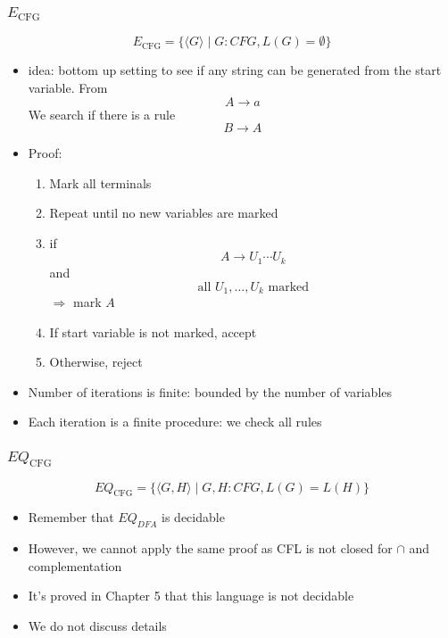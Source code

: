 \begin{frame}[allowframebreaks] \frametitle{$E_{\text{CFG}}$}
\begin{equation*}
  E_{\text{CFG}}
=\{\langle  G\rangle \mid
G: CFG, L(G)=\emptyset\}
\end{equation*}
  \begin{itemize}
  \item idea: bottom up setting to see if any string can be generated
    from the start variable. From
  \begin{equation*}
    A\rightarrow a
  \end{equation*}
  We search if there is a rule
\begin{equation*}
  B\rightarrow A
\end{equation*}

\item Proof:
  \begin{enumerate}
  \item Mark all terminals
  \item Repeat until no new variables are marked

  \item [] \quad if
    \begin{equation*}
    A\rightarrow U_1\cdots U_k
  \end{equation*}
   \quad and 
   \begin{equation*}
\text{all }    U_1, \ldots, U_k \text{ marked}
 \end{equation*}
\quad $\Rightarrow$  mark $A$
\item If start variable \alert{is not} marked, accept
\item [] Otherwise, reject
  \end{enumerate}
\item Number of iterations is finite: bounded by the number of
  variables
\item Each iteration is a finite procedure: we check all rules
\end{itemize}\end{frame} \begin{frame}[allowframebreaks] \frametitle{$EQ_{\text{CFG}}$}
\begin{equation*}
  EQ_{\text{CFG}}
=\{\langle  G,H\rangle \mid G,H: CFG, L(G)=
L(H)\}
\end{equation*}
  \begin{itemize}
\item Remember that $EQ_{DFA}$ is decidable
\item However, we cannot apply the same proof as
 CFL is not closed for 
$\cap$ and complementation
\item It's proved in Chapter 5 that this language is not decidable
\item We do not discuss details
\end{itemize}\end{frame}

